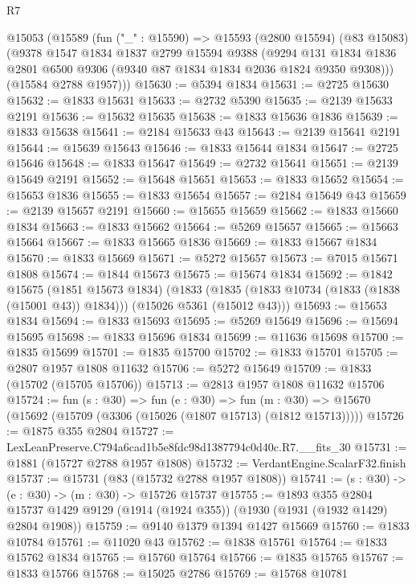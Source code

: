\begin{lexlean}{R7}
\begin{coremodule}
  @15053
    (@15589
      (fun ("_" : @15590) =>
      @15593
        (@2800 @15594)
        (@83 @15083)
        (@9378
          @1547
          @1834
          @1837
          @2799
          @15594
          @9388
          (@9294
            @131
            @1834
            @1836
            @2801
            @6500
            @9306
            (@9340 @87 @1834 @1834 @2036 @1824 @9350 @9308)))
        (@15584 @2788 @1957)))
@15630 := @5394 @1834
@15631 := @2725 @15630
@15632 := @1833 @15631
@15633 := @2732 @5390
@15635 := @2139 @15633 @2191
@15636 := @15632 @15635
@15638 := @1833 @15636 @1836
@15639 := @1833 @15638
@15641 := @2184 @15633 @43
@15643 := @2139 @15641 @2191
@15644 := @15639 @15643
@15646 := @1833 @15644 @1834
@15647 := @2725 @15646
@15648 := @1833 @15647
@15649 := @2732 @15641
@15651 := @2139 @15649 @2191
@15652 := @15648 @15651
@15653 := @1833 @15652
@15654 := @15653 @1836
@15655 := @1833 @15654
@15657 := @2184 @15649 @43
@15659 := @2139 @15657 @2191
@15660 := @15655 @15659
@15662 := @1833 @15660 @1834
@15663 := @1833 @15662
@15664 := @5269 @15657
@15665 := @15663 @15664
@15667 := @1833 @15665 @1836
@15669 := @1833 @15667 @1834
@15670 := @1833 @15669
@15671 := @5272 @15657
@15673 := @7015 @15671 @1808
@15674 := @1844 @15673
@15675 := @15674 @1834
@15692 := @1842
    @15675
    (@1851 @15673 @1834)
    (@1833 (@1835 (@1833 @10734 (@1833 (@1838 (@15001 @43)) @1834))) (@15026 @5361 (@15012 @43)))
@15693 := @15653 @1834
@15694 := @1833 @15693
@15695 := @5269 @15649
@15696 := @15694 @15695
@15698 := @1833 @15696 @1834
@15699 := @11636 @15698
@15700 := @1835 @15699
@15701 := @1835 @15700
@15702 := @1833 @15701
@15705 := @2807 @1957 @1808 @11632
@15706 := @5272 @15649
@15709 := @1833 (@15702 (@15705 @15706))
@15713 := @2813 @1957 @1808 @11632 @15706
@15724 := fun (s : @30) =>
  fun (e : @30) =>
  fun (m : @30) => @15670 (@15692 (@15709 (@3306 (@15026 (@1807 @15713) (@1812 @15713)))))
@15726 := @1875 @355 @2804
@15727 := LexLeanPreserve.C794a6cad1b5e8fdc98d1387794c0d40c.R7.__fits_30
@15731 := @1881 (@15727 @2788 @1957 @1808)
@15732 := VerdantEngine.ScalarF32.finish
@15737 := @15731 (@83 (@15732 @2788 @1957 @1808))
@15741 := (s : @30) -> (e : @30) -> (m : @30) -> @15726 @15737
@15755 := @1893
    @355
    @2804
    @15737
    @1429
    @9129
    (@1914 (@1924 @355))
    (@1930 (@1931 (@1932 @1429) @2804 @1908))
@15759 := @9140 @1379 @1394 @1427 @15669
@15760 := @1833 @10784
@15761 := @11020 @43
@15762 := @1838 @15761
@15764 := @1833 @15762 @1834
@15765 := @15760 @15764
@15766 := @1835 @15765
@15767 := @1833 @15766
@15768 := @15025 @2786
@15769 := @15768 @10781

\end{coremodule}
\end{lexlean}
